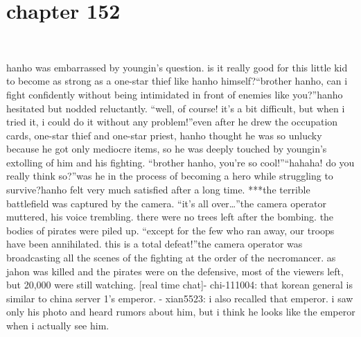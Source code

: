 \section{chapter 152}

                             




hanho was embarrassed by youngin’s question.
 is it really good for this little kid to become as strong as a one-star thief like hanho himself?“brother hanho, can i fight confidently without being intimidated in front of enemies like you?”hanho hesitated but nodded reluctantly.
“well, of course! it’s a bit difficult, but when i tried it, i could do it without any problem!”even after he drew the occupation cards, one-star thief and one-star priest, hanho thought he was so unlucky because he got only mediocre items, so he was deeply touched by youngin’s extolling of him and his fighting.
“brother hanho, you’re so cool!”“hahaha! do you really think so?”was he in the process of becoming a hero while struggling to survive?hanho felt very much satisfied after a long time.
***the terrible battlefield was captured by the camera.
“it’s all over…”the camera operator muttered, his voice trembling.
 there were no trees left after the bombing.
 the bodies of pirates were piled up.
“except for the few who ran away, our troops have been annihilated.
 this is a total defeat!”the camera operator was broadcasting all the scenes of the fighting at the order of the necromancer.
 as jahon was killed and the pirates were on the defensive, most of the viewers left, but 20,000 were still watching.
[real time chat]- chi-111004: that korean general is similar to china server 1’s emperor.
- xian5523: i also recalled that emperor.
 i saw only his photo and heard rumors about him, but i think he looks like the emperor when i actually see him.

